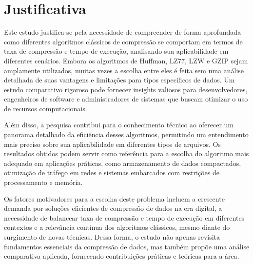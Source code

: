 \chapter{Justificativa}
\label{c.justificativa}

Este estudo justifica-se pela necessidade de compreender de forma aprofundada como diferentes algoritmos clássicos de compressão se comportam em termos de taxa de compressão e tempo de execução, analisando sua aplicabilidade em diferentes cenários. Embora os algoritmos de Huffman, LZ77, LZW e GZIP sejam amplamente utilizados, muitas vezes a escolha entre eles é feita sem uma análise detalhada de suas vantagens e limitações para tipos específicos de dados. Um estudo comparativo rigoroso pode fornecer insights valiosos para desenvolvedores, engenheiros de software e administradores de sistemas que buscam otimizar o uso de recursos computacionais.

Além disso, a pesquisa contribui para o conhecimento técnico ao oferecer um panorama detalhado da eficiência desses algoritmos, permitindo um entendimento mais preciso sobre sua aplicabilidade em diferentes tipos de arquivos. Os resultados obtidos podem servir como referência para a escolha do algoritmo mais adequado em aplicações práticas, como armazenamento de dados compactados, otimização de tráfego em redes e sistemas embarcados com restrições de processamento e memória.

Os fatores motivadores para a escolha deste problema incluem a crescente demanda por soluções eficientes de compressão de dados na era digital, a necessidade de balancear taxa de compressão e tempo de execução em diferentes contextos e a relevância contínua dos algoritmos clássicos, mesmo diante do surgimento de novas técnicas. Dessa forma, o estudo não apenas revisita fundamentos essenciais da compressão de dados, mas também propõe uma análise comparativa aplicada, fornecendo contribuições práticas e teóricas para a área.

